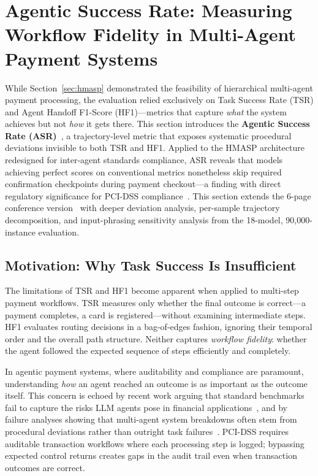 
\section{Agentic Success Rate: Measuring Workflow Fidelity in Multi-Agent Payment Systems}
\label{sec:asr}

While Section~\ref{sec:hmasp} demonstrated the feasibility of hierarchical multi-agent payment processing, the evaluation relied exclusively on Task Success Rate (TSR) and Agent Handoff F1-Score (HF1)---metrics that capture \textit{what} the system achieves but not \textit{how} it gets there. This section introduces the \textbf{Agentic Success Rate (ASR)}~\cite{huang2026asr}, a trajectory-level metric that exposes systematic procedural deviations invisible to both TSR and HF1. Applied to the HMASP architecture redesigned for inter-agent standards compliance, ASR reveals that models achieving perfect scores on conventional metrics nonetheless skip required confirmation checkpoints during payment checkout---a finding with direct regulatory significance for PCI-DSS compliance~\cite{pcisecurity2025ai}. This section extends the 6-page conference version~\cite{huang2026asr} with deeper deviation analysis, per-sample trajectory decomposition, and input-phrasing sensitivity analysis from the 18-model, 90{,}000-instance evaluation.

\subsection{Motivation: Why Task Success Is Insufficient}

The limitations of TSR and HF1 become apparent when applied to multi-step payment workflows. TSR measures only whether the final outcome is correct---a payment completes, a card is registered---without examining intermediate steps. HF1 evaluates routing decisions in a bag-of-edges fashion, ignoring their temporal order and the overall path structure. Neither captures \textit{workflow fidelity}: whether the agent followed the expected sequence of steps efficiently and completely.

In agentic payment systems, where auditability and compliance are paramount, understanding \textit{how} an agent reached an outcome is as important as the outcome itself. This concern is echoed by recent work arguing that standard benchmarks fail to capture the risks LLM agents pose in financial applications~\cite{chen2025benchmarksfail}, and by failure analyses showing that multi-agent system breakdowns often stem from procedural deviations rather than outright task failures~\cite{cemri2025multifail}. PCI-DSS requires auditable transaction workflows where each processing step is logged; bypassing expected control returns creates gaps in the audit trail even when transaction outcomes are correct.

